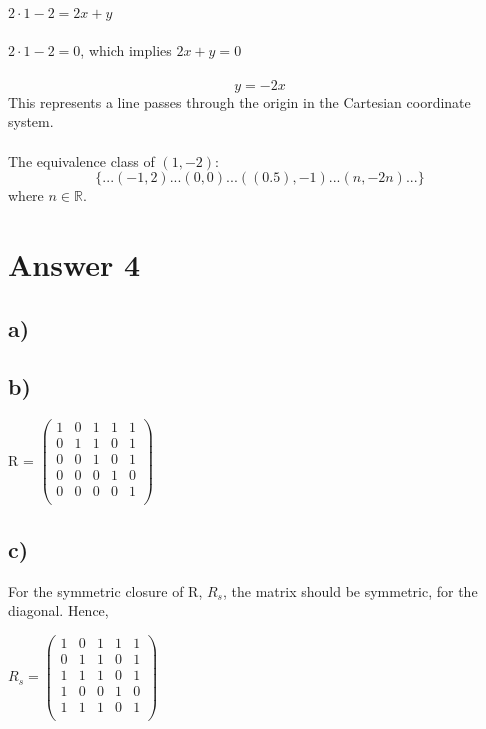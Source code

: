 \documentclass[12pt]{article}
\begin{document}
$2\cdot1 -2 = 2x + y$\\\\

$2\cdot1 -2 = 0$, which implies $2x + y = 0$\\\\

$$y = -2x$$
This represents a line passes through the origin in the Cartesian coordinate system.\\\\

The equivalence class of $(1,-2)$:
$$\{...(-1,2)...(0,0)...((0.5),-1)...(n,-2n)...\}$$ where $n\in \mathbb{R}$.

\section*{Answer 4}

\subsection*{a) }

\subsection*{b) }

R = 
$\begin{pmatrix} 
1&0&1&1&1\\
0&1&1&0&1\\
0&0&1&0&1\\ 
0&0&0&1&0\\
0&0&0&0&1\\

\end{pmatrix}$


\subsection*{c) }
For the symmetric closure of R, $R_s$, the matrix should be symmetric, for the diagonal. Hence,

$R_s = 
\begin{pmatrix} 
1&0&1&1&1\\
0&1&1&0&1\\
1&1&1&0&1\\ 
1&0&0&1&0\\
1&1&1&0&1\\
\end{pmatrix}$\\\\
\end{document}
